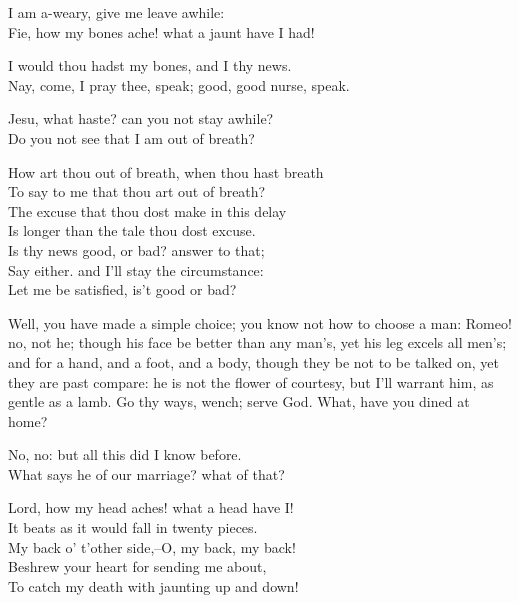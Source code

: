 \begin{speech}
I am a-weary, give me leave awhile: \\
Fie, how my bones ache! what a jaunt have I had! \\
\end{speech}
\begin{speech}
I would thou hadst my bones, and I thy news. \\
Nay, come, I pray thee, speak; good, good nurse, speak. \\
\end{speech}
\begin{speech}
Jesu, what haste? can you not stay awhile? \\
Do you not see that I am out of breath? \\
\end{speech}
\begin{speech}
How art thou out of breath, when thou hast breath
\\
To say to me that thou art out of breath? \\
The excuse that thou dost make in this delay \\
Is longer than the tale thou dost excuse. \\
Is thy news good, or bad? answer to that; \\
Say either. and I'll stay the circumstance: \\
Let me be satisfied, is't good or bad? \\
\end{speech}
\begin{speech}
Well, you have made a simple
choice; you know not how to choose a man:
Romeo! no, not he; though his face be better
than any man's, yet his leg excels all men's;
and for a hand, and a foot, and a body,
though they be not to be talked on, yet they
are past compare: he is not the flower of courtesy,
but I'll warrant him, as gentle as a
lamb. Go thy ways, wench; serve God.
What, have you dined at home?
\end{speech}
\begin{speech}
No, no: but all this did I know before. \\
What says he of our marriage? what of that? \\
\end{speech}
\begin{speech}
Lord, how my head aches! what a head have I! \\

It beats as it would fall in twenty pieces. \\
My back o' t'other side,--O, my back, my back! \\
Beshrew your heart for sending me about, \\
To catch my death with jaunting up and down! \\
\end{speech}
